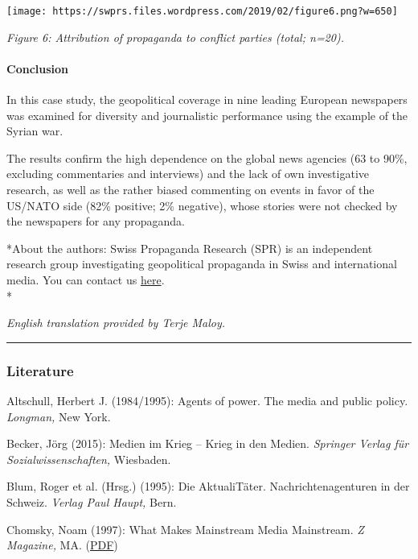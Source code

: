\texttt{[image: https://swprs.files.wordpress.com/2019/02/figure6.png?w=650]}

\emph{Figure 6: Attribution of propaganda to conflict parties (total;
n=20).}

\hypertarget{conclusion}{%
\paragraph{Conclusion}\label{conclusion}}

In this case study, the geopolitical coverage in nine leading European
newspapers was examined for diversity and journalistic performance using
the example of the Syrian war.

The results confirm the high dependence on the global news agencies (63
to 90\%, excluding commentaries and interviews) and the lack of own
investigative research, as well as the rather biased commenting on
events in favor of the US/NATO side (82\% positive; 2\% negative), whose
stories were not checked by the newspapers for any propaganda.

*About the authors: Swiss Propaganda Research (SPR) is an independent
research group investigating geopolitical propaganda in Swiss and
international media. You can contact us
\href{https://swprs.org/contact/}{here}.\\
*

\emph{English translation provided by Terje Maloy.}

\begin{center}\rule{0.5\linewidth}{\linethickness}\end{center}

\hypertarget{literature}{%
\subsubsection{Literature}\label{literature}}

Altschull, Herbert J. (1984/1995): Agents of power. The media and public
policy. \emph{Longman,} New York.

Becker, Jörg (2015): Medien im Krieg -- Krieg in den Medien.
\emph{Springer Verlag für Sozialwissenschaften,} Wiesbaden.

Blum, Roger et al. (Hrsg.) (1995): Die AktualiTäter.
Nachrichtenagenturen in der Schweiz. \emph{Verlag Paul Haupt,} Bern.

Chomsky, Noam (1997): What Makes Mainstream Media Mainstream. \emph{Z
Magazine,} MA. (\href{https://chomsky.info/199710__/}{PDF})

